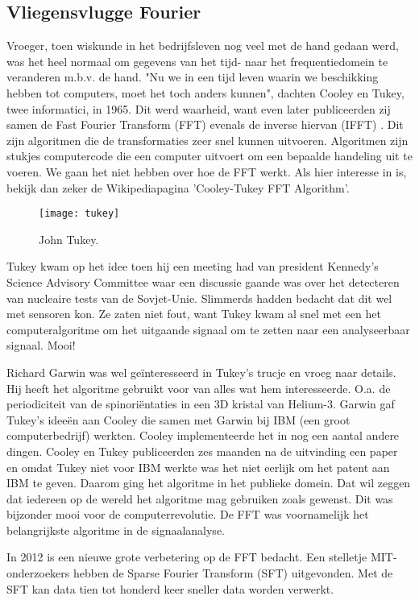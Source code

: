 \documentclass[11pt,fleqn]{book} %
\begin{document}
\subsection{Vliegensvlugge Fourier}
Vroeger, toen wiskunde in het bedrijfsleven nog veel met de hand gedaan werd, was het heel normaal om gegevens van het tijd- naar het frequentiedomein te veranderen m.b.v. de hand. "Nu we in een tijd leven waarin we beschikking hebben tot computers, moet het toch anders kunnen", dachten Cooley en Tukey, twee informatici, in 1965. Dit werd waarheid, want even later publiceerden zij samen de Fast Fourier Transform (FFT) evenals de inverse hiervan (IFFT) \cite{fft}. Dit zijn algoritmen die de transformaties zeer snel kunnen uitvoeren. Algoritmen zijn stukjes computercode die een computer uitvoert om een bepaalde handeling uit te voeren. We gaan het niet hebben over hoe de FFT werkt. Als hier interesse in is, bekijk dan zeker de Wikipediapagina 'Cooley-Tukey FFT Algorithm'.

\begin{figure}[h]
	\centering\texttt{[image: tukey]}
	\caption{John Tukey.}
	\label{fig:tukey}
\end{figure}

Tukey kwam op het idee toen hij een meeting had van president Kennedy’s Science Advisory Committee waar een discussie gaande was over het detecteren van nucleaire tests van de Sovjet-Unie. Slimmerds hadden bedacht dat dit wel met sensoren kon. Ze zaten niet fout, want Tukey kwam al snel met een het computeralgoritme om het uitgaande signaal om te zetten naar een analyseerbaar signaal. Mooi!

Richard Garwin was wel geïnteresseerd in Tukey’s trucje en vroeg naar details. Hij heeft het algoritme gebruikt voor van alles wat hem interesseerde. O.a. de periodiciteit van de spinoriëntaties in een 3D kristal van Helium-3. Garwin gaf Tukey’s ideeën aan Cooley die samen met Garwin bij IBM (een groot computerbedrijf) werkten. Cooley implementeerde het in nog een aantal andere dingen. Cooley en Tukey publiceerden zes maanden na de uitvinding een paper en omdat Tukey niet voor IBM werkte was het niet eerlijk om het patent aan IBM te geven. Daarom ging het algoritme in het publieke domein. Dat wil zeggen dat iedereen op de wereld het algoritme mag gebruiken zoals gewenst. Dit was bijzonder mooi voor de computerrevolutie. De FFT was voornamelijk het belangrijkste algoritme in de signaalanalyse.

In 2012 is een nieuwe grote verbetering op de FFT bedacht. Een stelletje MIT-onderzoekers hebben de Sparse Fourier Transform (SFT) uitgevonden. Met de SFT kan data tien tot honderd keer sneller data worden verwerkt.
\end{document}
